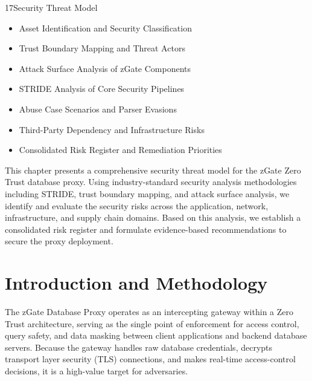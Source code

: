 
\begin{sectionintro}{17}{Security Threat Model}{
  \begin{itemize}[leftmargin=1.5em]
    \item Asset Identification and Security Classification
    \item Trust Boundary Mapping and Threat Actors
    \item Attack Surface Analysis of zGate Components
    \item STRIDE Analysis of Core Security Pipelines
    \item Abuse Case Scenarios and Parser Evasions
    \item Third-Party Dependency and Infrastructure Risks
    \item Consolidated Risk Register and Remediation Priorities
  \end{itemize}
}
This chapter presents a comprehensive security threat model for the zGate Zero Trust database proxy. Using industry-standard security analysis methodologies including STRIDE, trust boundary mapping, and attack surface analysis, we identify and evaluate the security risks across the application, network, infrastructure, and supply chain domains. Based on this analysis, we establish a consolidated risk register and formulate evidence-based recommendations to secure the proxy deployment.
\end{sectionintro}

\section{Introduction and Methodology}

The zGate Database Proxy operates as an intercepting gateway within a Zero Trust architecture, serving as the single point of enforcement for access control, query safety, and data masking between client applications and backend database servers. Because the gateway handles raw database credentials, decrypts transport layer security (TLS) connections, and makes real-time access-control decisions, it is a high-value target for adversaries. 

